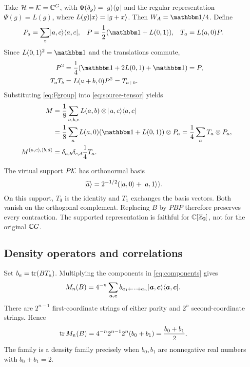 \documentclass[aps,pra,reprint,nofootinbib,onecolumn]{revtex4-2}
\begin{document}
Take $\mathcal{H}=\mathcal{K}=\mathbb{C}^G$, with
$\Phi(\delta_g)=\lvert g\rangle\langle g\rvert$ and the regular representation
$\Psi(g)=L(g)$, where $L(g)\lvert x\rangle=\lvert g+x\rangle$. Then $W_A=\Id/4$.
Define
\begin{align}
	P_a & =\sum_c\ket{a,c}\bra{a,c},
	    &
	P   & =\frac12(\Id+L(0,1)),
	    &
	T_a & =L(a,0)P.
\end{align}
Since $L(0,1)^2=\Id$ and the translations commute,
\begin{align}
	P^2    & =\frac14(\Id+2L(0,1)+\Id)=P,
	\\
	T_aT_b & =L(a+b,0)P^2=T_{a+b}.
	\label{eq:Tmult}
\end{align}
Substituting \cref{eq:Fgroup} into \cref{eq:source-tensor} yields
\begin{align}
	M
	 & =\frac18\sum_{a,b,c}L(a,b)\otimes\ket{a,c}\bra{a,c}
	\\
	 & =\frac18\sum_aL(a,0)(\Id+L(0,1))\otimes P_a
	=\frac14\sum_aT_a\otimes P_a,
	\label{eq:explicitM}                                   \\
	M^{(a,c),(b,d)}
	 & =\delta_{a,b}\delta_{c,d}\frac14T_a.
	\label{eq:components}
\end{align}

The virtual support $P\mathcal{K}$ has orthonormal basis
\begin{align}
	\lvert\widetilde a\rangle
	 & =2^{-1/2}(\lvert a,0\rangle+\lvert a,1\rangle).
\end{align}
On this support, $T_0$ is the identity and $T_1$ exchanges the basis
vectors. Both vanish on the orthogonal complement. Replacing $B$ by
$PBP$ therefore preserves every contraction. The supported
representation is faithful for $\mathbb{C}[\mathbb{Z}_2]$, not for the original
$\mathbb{C} G$.

\subsection{Density operators and correlations}

Set $b_a=\operatorname{tr}(BT_a)$. Multiplying the components in
\cref{eq:components} gives
\begin{align}
	M_n(B)
	 & =4^{-n}\sum_{\boldsymbol a,\boldsymbol c}
	b_{a_1+\cdots+a_n}
	\lvert\boldsymbol a,\boldsymbol c\rangle
	\langle\boldsymbol a,\boldsymbol c\rvert.
	\label{eq:rawfamily}
\end{align}
There are $2^{n-1}$ first-coordinate strings of either parity and
$2^n$ second-coordinate strings. Hence
\begin{align}
	\operatorname{tr} M_n(B)
	 & =4^{-n}2^{n-1}2^n(b_0+b_1)
	=\frac{b_0+b_1}{2}.
\end{align}
The family is a density family precisely when $b_0,b_1$ are
nonnegative real numbers with $b_0+b_1=2$.
\end{document}
